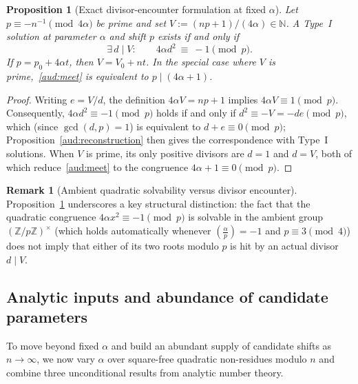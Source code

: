 \documentclass[11pt, a4paper]{article}
\theoremstyle{plain}
\newtheorem{proposition}[theorem]{Proposition}
\theoremstyle{definition}
\newtheorem{remark}[theorem]{Remark}
\newcommand{\N}{\mathbb{N}}
\newcommand{\Z}{\mathbb{Z}}
\newcommand{\leg}[2]{\left(\frac{#1}{#2}\right)}
\begin{document}
\begin{proposition}[Exact divisor-encounter formulation at fixed $\alpha$]\label{aud:meeting}
Let $p\equiv -n^{-1}\pmod{4\alpha}$ be prime and set $V:=(np+1)/(4\alpha)\in\N$. A Type~I solution at parameter $\alpha$ and shift $p$ exists if and only if
\begin{equation}\label{aud:meet}
\exists\,d\mid V:\qquad 4\alpha d^{2}\ \equiv\ -1\pmod p.
\end{equation}
If $p=p_0+4\alpha t$, then $V=V_0+nt$. In the special case where $V$ is prime,~\eqref{aud:meet} is equivalent to $p\mid(4\alpha+1)$.
\end{proposition}
\begin{proof}
Writing $e=V/d$, the definition $4\alpha V=np+1$ implies $4\alpha V\equiv 1\pmod p$. Consequently, $4\alpha d^{2}\equiv -1\pmod p$ holds if and only if $d^{2}\equiv -V=-de\pmod p$, which (since $\gcd(d,p)=1$) is equivalent to $d+e\equiv 0\pmod p$; Proposition~\ref{aud:reconstruction} then gives the correspondence with Type~I solutions. When $V$ is prime, its only positive divisors are $d=1$ and $d=V$, both of which reduce~\eqref{aud:meet} to the congruence $4\alpha+1\equiv 0\pmod p$.
\end{proof}

\begin{remark}[Ambient quadratic solvability versus divisor encounter]
Proposition~\ref{aud:meeting} underscores a key structural distinction: the fact that the quadratic congruence $4\alpha x^{2}\equiv -1\pmod p$ is solvable in the ambient group $(\Z/p\Z)^{\times}$ (which holds automatically whenever $\leg{\alpha}{p}=-1$ and $p\equiv 3\pmod 4$) does not imply that either of its two roots modulo $p$ is hit by an actual divisor $d\mid V$.
\end{remark}

\subsection{Analytic inputs and abundance of candidate parameters}\label{aud:inputs}

To move beyond fixed $\alpha$ and build an abundant supply of candidate shifts as $n\to\infty$, we now vary $\alpha$ over square-free quadratic non-residues modulo $n$ and combine three unconditional results from analytic number theory.
\end{document}
